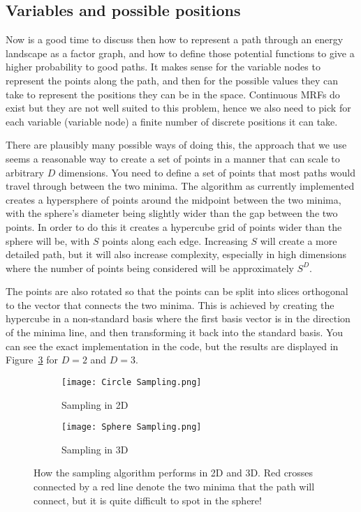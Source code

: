 \subsection{Variables and possible positions}
\label{subsec:poss_poses}
Now is a good time to discuss then how to represent a path through an energy landscape as a factor graph, and how to define those potential functions to give a higher probability to good paths.
It makes sense for the variable nodes to represent the points along the path, and then for the possible values they can take to represent the positions they can be in the space.
Continuous MRFs do exist but they are not well suited to this problem, hence we also need to pick for each variable (variable node) a finite number of discrete positions it can take.

There are plausibly many possible ways of doing this, the approach that we use seems a reasonable way to create a set of points in a manner that can scale to arbitrary $D$ dimensions.
You need to define a set of points that most paths would travel through between the two minima.
The algorithm as currently implemented creates a hypersphere of points around the midpoint between the two minima, with the sphere's diameter being slightly wider than the gap between the two points.
In order to do this it creates a hypercube grid of points wider than the sphere will be, with $S$ points along each edge.
Increasing $S$ will create a more detailed path, but it will also increase complexity, especially in high dimensions where the number of points being considered will be approximately $S^D$.

The points are also rotated so that the points can be split into slices orthogonal to the vector that connects the two minima.
This is achieved by creating the hypercube in a non-standard basis where the first basis vector is in the direction of the minima line, and then transforming it back into the standard basis.
You can see the exact implementation in the code, but the results are displayed in Figure~\ref{fig:points_samp} for $D=2$ and $D=3$.

\begin{figure}[h]
\centering
\begin{subfigure}{.5\textwidth}
  \centering
  \texttt{[image: Circle Sampling.png]}
  \caption{Sampling in 2D}
  \label{fig:circ_samp}
\end{subfigure}%
\begin{subfigure}{.5\textwidth}
  \centering
  \texttt{[image: Sphere Sampling.png]}
  \caption{Sampling in 3D}
  \label{fig:sphere_samp}
\end{subfigure}
\caption{How the sampling algorithm performs in 2D and 3D. Red crosses connected by a red line denote the two minima that the path will connect, but it is quite difficult to spot in the sphere!}
\label{fig:points_samp}
\end{figure}

